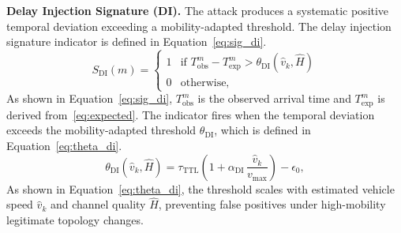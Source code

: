 \textbf{Delay Injection Signature (DI).}
The attack produces a systematic positive temporal deviation
exceeding a mobility-adapted threshold. The delay injection
signature indicator is defined in Equation~\eqref{eq:sig_di}.
\begin{equation}
S_{\mathrm{DI}}(m) =
  \begin{cases}
    1 & \text{if } T_{\mathrm{obs}}^{m} - T_{\mathrm{exp}}^{m}
        > \theta_{\mathrm{DI}}(\hat{v}_k,\hat{H}) \\
    0 & \text{otherwise,}
  \end{cases}
\label{eq:sig_di}
\end{equation}
As shown in Equation~\eqref{eq:sig_di}, $T_{\mathrm{obs}}^{m}$
is the observed arrival time and $T_{\mathrm{exp}}^{m}$ is derived
from~\eqref{eq:expected}. The indicator fires when the temporal
deviation exceeds the mobility-adapted threshold
$\theta_{\mathrm{DI}}$, which is defined in
Equation~\eqref{eq:theta_di}.
\begin{equation}
\theta_{\mathrm{DI}}(\hat{v}_k,\hat{H}) =
  \tau_{\mathrm{TTL}}\!\left(1 +
  \alpha_{\mathrm{DI}}\,\frac{\hat{v}_k}{v_{\max}}\right) - \epsilon_0,
\label{eq:theta_di}
\end{equation}
As shown in Equation~\eqref{eq:theta_di}, the threshold scales
with estimated vehicle speed $\hat{v}_k$ and channel quality
$\hat{H}$, preventing false positives under high-mobility
legitimate topology changes.

